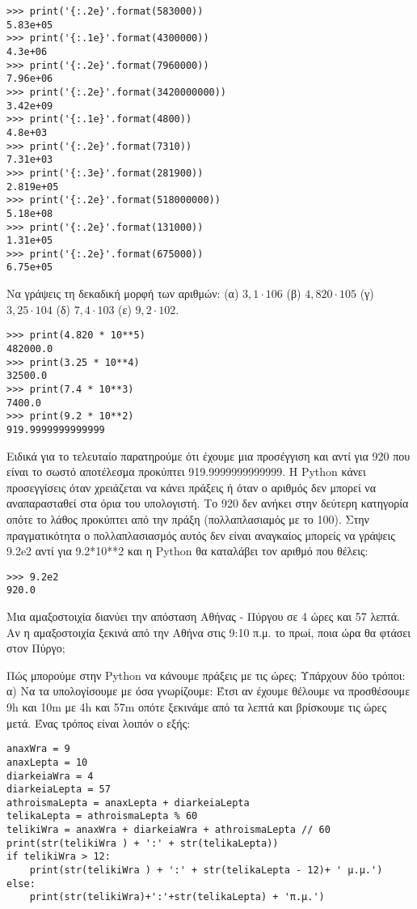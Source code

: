 \begin{lstlisting}
>>> print('{:.2e}'.format(583000))
5.83e+05
>>> print('{:.1e}'.format(4300000))
4.3e+06
>>> print('{:.2e}'.format(7960000))
7.96e+06
>>> print('{:.2e}'.format(3420000000))
3.42e+09
>>> print('{:.1e}'.format(4800))
4.8e+03
>>> print('{:.2e}'.format(7310))
7.31e+03
>>> print('{:.3e}'.format(281900))
2.819e+05
>>> print('{:.2e}'.format(518000000))
5.18e+08
>>> print('{:.2e}'.format(131000))
1.31e+05
>>> print('{:.2e}'.format(675000))
6.75e+05
\end{lstlisting}
\begin{exercise}
Nα γράψεις τη δεκαδική μορφή των αριθμών:
(α) $3,1 \cdot 106$ (β) $4,820 \cdot 105$ (γ) $3,25 \cdot 104$ (δ) $7,4 \cdot 103$ (ε) $9,2 \cdot 102$.
\end{exercise}
\begin{lstlisting}
>>> print(4.820 * 10**5)
482000.0
>>> print(3.25 * 10**4)
32500.0
>>> print(7.4 * 10**3)
7400.0
>>> print(9.2 * 10**2)
919.9999999999999
\end{lstlisting}
Ειδικά για το τελευταίο παρατηρούμε ότι έχουμε μια προσέγγιση και αντί για 920 που είναι το σωστό αποτέλεσμα προκύπτει 919.9999999999999. H Python κάνει προσεγγίσεις όταν χρειάζεται να κάνει πράξεις ή όταν ο αριθμός δεν μπορεί να αναπαρασταθεί στα όρια του υπολογιστή. Το 920 δεν ανήκει στην δεύτερη κατηγορία οπότε το λάθος προκύπτει από την πράξη (πολλαπλασιαμός με το 100). Στην πραγματικότητα ο πολλαπλασιασμός αυτός δεν είναι αναγκαίος μπορείς να γράψεις 9.2e2 αντί για 9.2*10**2 και η Python θα καταλάβει τον αριθμό που θέλεις:
\begin{lstlisting}
>>> 9.2e2
920.0
\end{lstlisting}
\begin{exercise}
Mια αμαξοστοιχία διανύει την απόσταση Αθήνας -
Πύργου σε 4 ώρες και 57 λεπτά.
Αν η αμαξοστοιχία ξεκινά από την Αθήνα στις 9:10
π.μ. το πρωί, ποια ώρα θα φτάσει στον Πύργο;
\end{exercise}
Πώς μπορούμε στην Python να κάνουμε πράξεις με τις ώρες;  Υπάρχουν δύο τρόποι:
α)
Να τα υπολογίσουμε με όσα γνωρίζουμε:
Έτσι αν έχουμε θέλουμε να προσθέσουμε 9h και 10m με 4h και 57m οπότε ξεκινάμε από τα λεπτά και βρίσκουμε τις ώρες μετά. Ένας τρόπος είναι λοιπόν ο εξής:
\begin{lstlisting}
anaxWra = 9
anaxLepta = 10
diarkeiaWra = 4
diarkeiaLepta = 57
athroismaLepta = anaxLepta + diarkeiaLepta
telikaLepta = athroismaLepta % 60
telikiWra = anaxWra + diarkeiaWra + athroismaLepta // 60
print(str(telikiWra ) + ':' + str(telikaLepta))
if telikiWra > 12:
    print(str(telikiWra ) + ':' + str(telikaLepta - 12)+ ' μ.μ.')
else:
    print(str(telikiWra)+':'+str(telikaLepta) + 'π.μ.')
\end{lstlisting}

